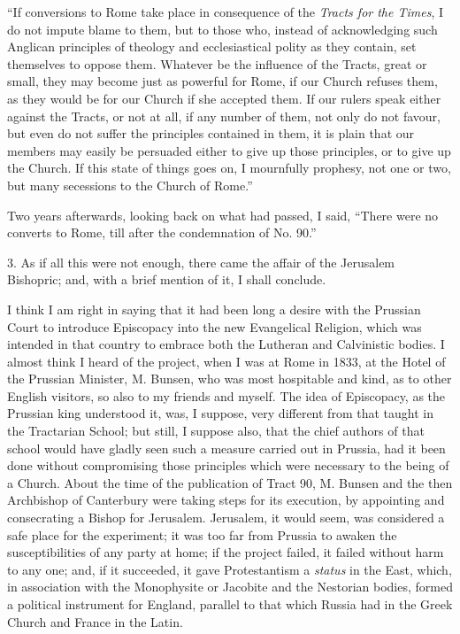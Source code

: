 ``If conversions to Rome take place in consequence of the \emph{Tracts
for the Times}, I do not impute blame to them, but to those who, instead
of acknowledging such Anglican principles of theology and ecclesiastical
polity as they contain, set themselves to oppose them. Whatever be the
influence of the Tracts, great or small, they may become just as
powerful for Rome, if our Church refuses them, as they would be for our
Church if she accepted them. If our rulers speak either against the
Tracts, or not at all, if any number of them, not only do not favour,
but even do not suffer the principles contained in them, it is plain
that our members may easily be persuaded either to give up those
principles, or to give up the Church. If this state of things goes on, I
mournfully prophesy, not one or two, but many secessions to the Church
of Rome.''

Two years afterwards, looking back on what had passed, I said,
``There were no converts to Rome, till after the condemnation of No.
90.''

3. As if all this were not enough, there came the affair of the
Jerusalem Bishopric; and, with a brief mention of it, I shall conclude.

I think I am right in saying that it had been long a desire with the
Prussian Court to introduce Episcopacy into the new Evangelical
Religion, which was intended in that country to embrace both the
Lutheran and Calvinistic bodies. I almost think I heard of the
project, when I was at Rome in 1833, at the Hotel of the Prussian
Minister, M. Bunsen, who was most hospitable and kind, as to other
English visitors, so also to my friends and myself. The
idea of Episcopacy, as the Prussian king understood it, was, I
suppose, very different from that taught in the Tractarian School;
but still, I suppose also, that the chief authors of that school would
have gladly seen such a measure carried out in Prussia, had it been done
without compromising those principles which were necessary to the being
of a Church. About the time of the publication of Tract 90, M. Bunsen
and the then Archbishop of Canterbury were taking steps for its
execution, by appointing and consecrating a Bishop for Jerusalem.
Jerusalem, it would seem, was considered a safe place for the
experiment; it was too far from Prussia to awaken the susceptibilities of
any party at home; if the project failed, it failed without harm to any
one; and, if it succeeded, it gave Protestantism a \emph{status} in the
East, which, in association with the Monophysite or Jacobite and the
Nestorian bodies, formed a political instrument for England, parallel to
that which Russia had in the Greek Church and France in the Latin.

